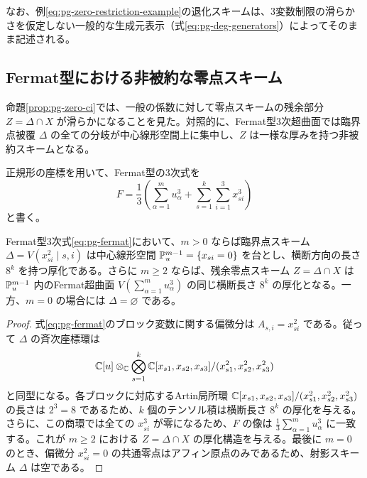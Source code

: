なお、例\eqref{eq:pg-zero-restriction-example}の退化スキームは、3変数制限の滑らかさを仮定しない一般的な生成元表示（式\eqref{eq:pg-deg-generators}）によってそのまま記述される。

\subsection{Fermat型における非被約な零点スキーム}
命題\ref{prop:pg-zero-ci}では、一般の係数に対して零点スキームの残余部分 $Z=\Delta\cap X$ が滑らかになることを見た。対照的に、Fermat型3次超曲面では臨界点被覆 $\Delta$ の全ての分岐が中心線形空間上に集中し、$Z$ は一様な厚みを持つ非被約スキームとなる。

正規形の座標を用いて、Fermat型の3次式を
\begin{equation}\label{eq:pg-fermat}
F=\frac13\left(\sum_{\alpha=1}^m u_\alpha^3+
\sum_{s=1}^k\sum_{i=1}^3x_{si}^3\right)
\end{equation}
と書く。
\begin{proposition}\label{prop:pg-fermat-thickening}
Fermat型3次式\eqref{eq:pg-fermat}において、$m>0$ ならば臨界点スキーム $\Delta=V(x_{si}^2\mid s,i)$ は中心線形空間 $\mathbb P_u^{m-1}=\{x_{si}=0\}$ を台とし、横断方向の長さ $8^k$ を持つ厚化である。さらに $m\geq2$ ならば、残余零点スキーム $Z=\Delta\cap X$ は $\mathbb P_u^{m-1}$ 内のFermat超曲面 $V(\sum_{\alpha=1}^m u_\alpha^3)$ の同じ横断長さ $8^k$ の厚化となる。一方、$m=0$ の場合には $\Delta=\varnothing$ である。
\end{proposition}
\begin{proof}
式\eqref{eq:pg-fermat}のブロック変数に関する偏微分は $A_{s,i}=x_{si}^2$ である。従って $\Delta$ の斉次座標環は
\begin{equation}
\mathbb C[u]\otimes_\mathbb C\bigotimes_{s=1}^k
\mathbb C[x_{s1},x_{s2},x_{s3}]/(x_{s1}^2,x_{s2}^2,x_{s3}^2)
\end{equation}
と同型になる。各ブロックに対応するArtin局所環 $\mathbb C[x_{s1},x_{s2},x_{s3}]/(x_{s1}^2,x_{s2}^2,x_{s3}^2)$ の長さは $2^3=8$ であるため、$k$ 個のテンソル積は横断長さ $8^k$ の厚化を与える。さらに、この商環では全ての $x_{si}^3$ が零になるため、$F$ の像は $\frac13\sum_{\alpha=1}^m u_\alpha^3$ に一致する。これが $m\ge2$ における $Z=\Delta\cap X$ の厚化構造を与える。最後に $m=0$ のとき、偏微分 $x_{si}^2=0$ の共通零点はアフィン原点のみであるため、射影スキーム $\Delta$ は空である。
\end{proof}
